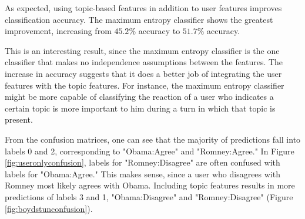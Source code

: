 
As expected, using topic-based features in addition to user features improves classification accuracy. The maximum entropy classifier shows the greatest improvement, increasing from $45.2\%$ accuracy to $51.7\%$ accuracy.

This is an interesting result, since the maximum entropy classifier is the one classifier that makes no independence assumptions between the features. The increase in accuracy suggests that it does a better job of integrating the user features with the topic features. For instance, the maximum entropy classifier might be more capable of classifying the reaction of a user who indicates a certain topic is more important to him during a turn in which that topic is present.

From the confusion matrices, one can see that the majority of predictions fall into labels 0 and 2, corresponding to "Obama:Agree" and "Romney:Agree." In Figure \ref{fig:useronlyconfusion}, labels for "Romney:Disagree" are often confused with labels for "Obama:Agree." This makes sense, since a user who disagrees with Romney most likely agrees with Obama. Including topic features results in more predictions of labels 3 and 1, "Obama:Disagree" and "Romney:Disagree" (Figure \ref{fig:boydstunconfusion}).

